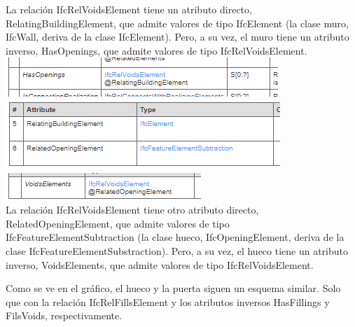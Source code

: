 \documentclass[spanish,10pt,a4paper,final,oneside]{article}
\begin{document}
\begin{itemize}
La relación IfcRelVoidsElement tiene un atributo directo, RelatingBuildingElement, que admite valores de tipo IfcElement (la clase muro, IfcWall, deriva de la clase IfcElement). Pero, a su vez, el muro tiene un atributo inverso, HasOpenings, que admite valores de tipo IfcRelVoidsElement.
\vspace{0.1cm}
\\ \includegraphics[scale=0.8]{atributo HasOpenings}
\vspace{0.1cm}
\\ \includegraphics[scale=0.8]{atributos de IfcRelVoidsElement}
\\ \includegraphics[scale=0.8]{atributo VoidsElements}
\\La relación IfcRelVoidsElement tiene otro atributo directo, RelatedOpeningElement, que admite valores de tipo IfcFeatureElementSubtraction (la clase hueco, IfcOpeningElement, deriva de la clase IfcFeatureElementSubstraction). Pero, a su vez, el hueco tiene un atributo inverso, VoidsElements, que admite valores de tipo IfcRelVoidsElement.

Como se ve en el gráfico, el hueco y la puerta siguen un esquema similar. Solo que con la relación IfcRelFillsElement y los atributos inversos HasFillings y FilsVoids, respectivamente.

\end{itemize}
\end{document}
